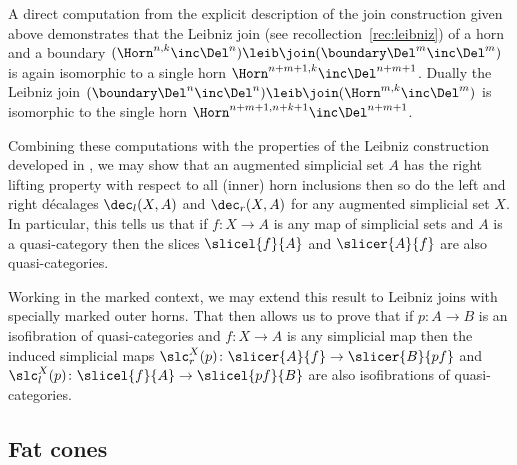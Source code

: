   \begin{obs}\label{obs:slice-and-qcats}
    A direct computation from the explicit description of the join construction given above demonstrates that the Leibniz join (see recollection~\ref{rec:leibniz}) of a horn and a boundary $(\Horn^{n,k}\inc\Del^n)\leib\join(\boundary\Del^m\inc\Del^m)$ is again isomorphic to a single horn $\Horn^{n+m+1,k}\inc\Del^{n+m+1}$. Dually the Leibniz join $(\boundary\Del^n\inc\Del^n)\leib\join(\Horn^{m,k}\inc\Del^m)$ is isomorphic to the single horn $\Horn^{n+m+1,n+k+1}\inc\Del^{n+m+1}$. 

    Combining these computations with the properties of the Leibniz construction developed in \cite[section~\ref*{reedy:sec:Leibniz-Reedy}]{RiehlVerity:2013kx}, we may show that an augmented simplicial set $A$ has the right lifting property with respect to all (inner) horn inclusions then so do the left and right d{\'e}calages $\dec_l(X,A)$ and $\dec_r(X,A)$ for any augmented simplicial set $X$. In particular, this tells us that if $f\colon X\to A$ is any map of simplicial sets and $A$ is a quasi-category then the slices $\slicel{f}{A}$ and $\slicer{A}{f}$ are also quasi-categories. 

    Working in the marked context, we may extend this result to Leibniz joins with specially marked outer horns. That then allows us to prove that if $p\colon A\to B$ is an isofibration of quasi-categories and $f\colon X\to A$ is any simplicial map then the induced simplicial maps $\slc^X_r(p)\colon \slicer{A}{f}\to \slicer{B}{pf}$ and $\slc^X_l(p)\colon \slicel{f}{A}\to \slicel{pf}{B}$ are also isofibrations of quasi-categories.
  \end{obs}

  \subsection{Fat cones}\label{subsec:cones}
  
